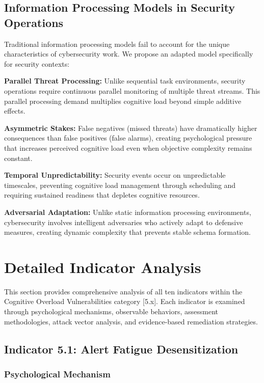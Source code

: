 \documentclass[11pt,a4paper]{article}
\begin{document}
\subsection{Information Processing Models in Security Operations}

Traditional information processing models fail to account for the unique characteristics of cybersecurity work. We propose an adapted model specifically for security contexts:

\textbf{Parallel Threat Processing:} Unlike sequential task environments, security operations require continuous parallel monitoring of multiple threat streams. This parallel processing demand multiplies cognitive load beyond simple additive effects.

\textbf{Asymmetric Stakes:} False negatives (missed threats) have dramatically higher consequences than false positives (false alarms), creating psychological pressure that increases perceived cognitive load even when objective complexity remains constant.

\textbf{Temporal Unpredictability:} Security events occur on unpredictable timescales, preventing cognitive load management through scheduling and requiring sustained readiness that depletes cognitive resources.

\textbf{Adversarial Adaptation:} Unlike static information processing environments, cybersecurity involves intelligent adversaries who actively adapt to defensive measures, creating dynamic complexity that prevents stable schema formation.

\section{Detailed Indicator Analysis}

This section provides comprehensive analysis of all ten indicators within the Cognitive Overload Vulnerabilities category [5.x]. Each indicator is examined through psychological mechanisms, observable behaviors, assessment methodologies, attack vector analysis, and evidence-based remediation strategies.

\subsection{Indicator 5.1: Alert Fatigue Desensitization}

\subsubsection{Psychological Mechanism}
\end{document}
